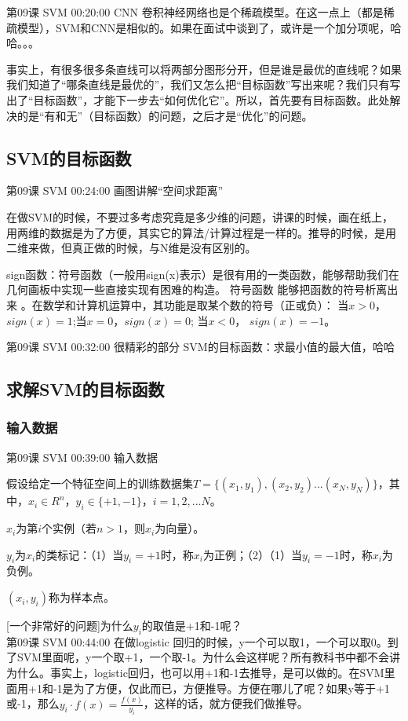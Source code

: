 \documentclass[UTF8]{ctexbook}
\begin{document}
第09课 SVM 00:20:00 CNN 卷积神经网络也是个稀疏模型。在这一点上（都是稀疏模型），SVM和CNN是相似的。如果在面试中谈到了，或许是一个加分项呢，哈哈。。。

事实上，有很多很多条直线可以将两部分图形分开，但是谁是最优的直线呢？如果我们知道了“哪条直线是最优的”，我们又怎么把“目标函数”写出来呢？我们只有写出了“目标函数”，才能下一步去“如何优化它”。所以，首先要有目标函数。此处解决的是“有和无”（目标函数）的问题，之后才是“优化”的问题。

\subsection{SVM的目标函数}

第09课 SVM 00:24:00 画图讲解“空间求距离”

在做SVM的时候，不要过多考虑究竟是多少维的问题，讲课的时候，画在纸上，用两维的数据是为了方便，其实它的算法/计算过程是一样的。推导的时候，是用二维来做，但真正做的时候，与N维是没有区别的。

sign函数：符号函数（一般用sign(x)表示）是很有用的一类函数，能够帮助我们在几何画板中实现一些直接实现有困难的构造。 符号函数 能够把函数的符号析离出来 。在数学和计算机运算中，其功能是取某个数的符号（正或负）： 当$x>0$，$sign(x)=1$;当$x=0$，$sign(x)=0$; 当$x<0$， $sign(x)=-1$。

第09课 SVM 00:32:00 很精彩的部分 SVM的目标函数：求最小值的最大值，哈哈

\subsection{求解SVM的目标函数}

\subsubsection{输入数据}

第09课 SVM 00:39:00 输入数据

假设给定一个特征空间上的训练数据集$T=\{(x_{1},y_{1}),(x_{2},y_{2})...(x_{N},y_{N})\}$，其中，$x_{i} \in R^{n}$，$y_{i} \in \{+1,-1\}$，$i=1,2,...N$。

$x_{i}$为第$i$个实例（若$n>1$，则$x_{i}$为向量）。

$y_{i}$为$x_{i}$的类标记：（1）当$y_{i}=+1$时，称$x_{i}$为正例；（2）（1）当$y_{i}=-1$时，称$x_{i}$为负例。

$(x_{i},y_{i})$称为样本点。

[一个非常好的问题]为什么$y_{i}$的取值是+1和-1呢？\\ 第09课 SVM 00:44:00
在做logistic 回归的时候，y一个可以取1，一个可以取0。到了SVM里面呢，y一个取+1，一个取-1。为什么会这样呢？所有教科书中都不会讲为什么。事实上，logistic回归，也可以用+1和-1去推导，是可以做的。在SVM里面用+1和-1是为了方便，仅此而已，方便推导。方便在哪儿了呢？如果y等于+1或-1，那么$y_{i} \cdot f(x) = \frac{f(x)}{y_{i}}$，这样的话，就方便我们做推导。
\end{document}
